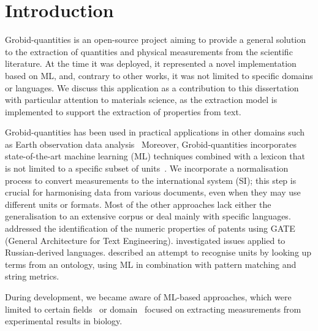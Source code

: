 \section{Introduction}

Grobid-quantities is an open-source project aiming to provide a general solution to the extraction of quantities and physical measurements from the scientific literature. 
At the time it was deployed, it represented a novel implementation based on ML, and, contrary to other works, it was not limited to specific domains or languages. 
We discuss this application as a contribution to this dissertation with particular attention to materials science, as the extraction model is implemented to support the extraction of properties from text. 

Grobid-quantities has been used in practical applications in other domains such as Earth observation data analysis~\cite{hundman2017measurement} 
Moreover, Grobid-quantities incorporates state-of-the-art machine learning (ML) techniques combined with a lexicon that is not limited to a specific subset of units~\cite{aras2014applications}.
We incorporate a normalisation process to convert measurements to the international system (SI); this step is crucial for harmonising data from various documents, even when they may use different units or formats. 
Most of the other approaches lack either the generalisation to an extensive corpus or deal mainly with specific languages. 
\cite{agatonovic2008large} addressed the identification of the numeric properties of patents using GATE (General Architecture for Text Engineering). 
\cite{am2013processing} investigated issues applied to Russian-derived languages. \cite{berrahou2013extract} described an attempt to recognise units by looking up terms from an ontology, using ML in combination with pattern matching and string metrics. 

During development, we became aware of ML-based approaches, which were limited to certain fields~\cite{dieb2015framework} or domain~\cite{kang_extracting_2013} focused on extracting measurements from experimental results in biology. 

